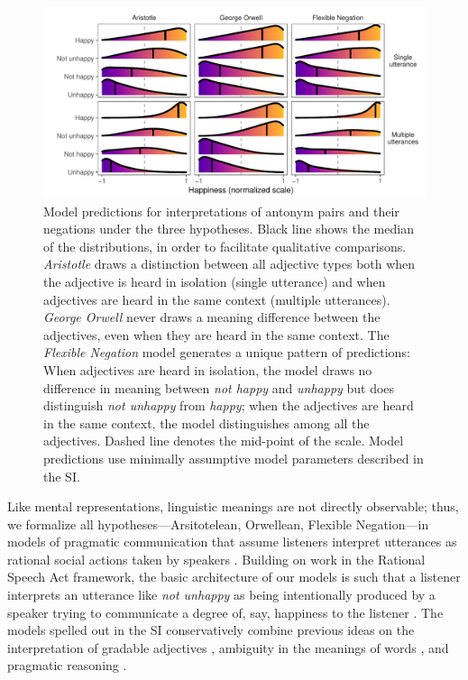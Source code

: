 \documentclass[floatsintext,doc]{apa6}
\newcommand{\ourmodel}{Flexible Negation\xspace}
\begin{document}
\begin{figure}[h!]
\centering \includegraphics[width=\textwidth]{figs/alternativeModels_dists4.pdf} 
\caption{\small Model predictions for interpretations of antonym pairs and their negations under the three hypotheses. Black line shows the median of the distributions, in order to facilitate qualitative comparisons. \emph{Aristotle} draws a distinction between all adjective types both when the adjective is heard in isolation (single utterance) and when adjectives are heard in the same context (multiple utterances). \emph{George Orwell} never draws a meaning difference between the adjectives, even when they are heard in the same context. The \emph{\ourmodel} model generates a unique pattern of predictions:  When adjectives are heard in isolation, the model draws no difference in meaning between \emph{not happy} and \emph{unhappy} but does distinguish \emph{not unhappy} from \emph{happy}; when the adjectives are heard in the same context, the model distinguishes among all the adjectives. Dashed line denotes the mid-point of the scale. Model predictions use minimally assumptive model parameters described in the SI.}
\label{fig:modelPredictions}
\end{figure}

 
Like mental representations, linguistic meanings are not directly observable; thus, we formalize all hypotheses---Arsitotelean, Orwellean, \ourmodel---in models of pragmatic communication that assume listeners interpret utterances as rational social actions taken by speakers \cite{FrankGoodman2014:Inferring-word-,FrankeScholler2016:Semantic-values}. 
Building on work in the Rational Speech Act framework, the basic architecture of our models is such that a listener interprets an utterance like \emph{not unhappy} as being intentionally produced by a speaker trying to communicate a degree of, say, happiness to the listener  \cite{Franke2015a, Goodman2016:RSA}.
The models spelled out in the SI conservatively combine previous ideas on the interpretation of gradable adjectives \cite{Kennedy2007, Lassiter2015}, ambiguity in the meanings of words \cite{Bergen2016}, and pragmatic reasoning \cite{Goodman2016:RSA}.
\end{document}

